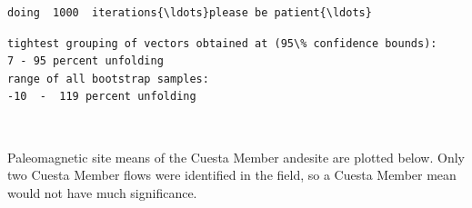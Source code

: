 \documentclass{article}
\begin{document}
    \begin{Verbatim}[commandchars=\\\{\}]
doing  1000  iterations{\ldots}please be patient{\ldots}
    \end{Verbatim}

    \begin{center}
    \end{center}
    
    \begin{center}
    \end{center}
    
    \begin{Verbatim}[commandchars=\\\{\}]
tightest grouping of vectors obtained at (95\% confidence bounds):
7 - 95 percent unfolding
range of all bootstrap samples: 
-10  -  119 percent unfolding
    \end{Verbatim}

    \begin{center}
    \end{center}
    { \hspace*{\fill} \\}
    
    Paleomagnetic site means of the Cuesta Member andesite are plotted
below. Only two Cuesta Member flows were identified in the field, so a
Cuesta Member mean would not have much significance.
\end{document}
